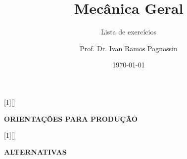 \usepackage[utf8]{inputenc}
\usepackage{lmodern}
\usepackage[T1]{fontenc}
\usepackage[brazil]{babel}

\usepackage{icomma}
\usepackage{amsmath}
\usepackage{amssymb}
\usepackage{xspace}
\usepackage[locale=FR]{siunitx}
\usepackage{booktabs}
\usepackage{hyperref}
\usepackage[margin=2.5cm]{geometry}
\usepackage{graphicx}\graphicspath{{assets/}}
\usepackage{icomma}
\usepackage{lastpage}
\usepackage{comment}

\usepackage{irpagnossin-basic}
\usepackage{irpagnossin-exam}

\usepackage{fancyhdr}
\fancyhead{}
\fancyfoot{}
\lfoot{}
\renewcommand{\headrulewidth}{0pt}
\pagestyle{fancy}


\title{Mecânica Geral}
\subtitle{Lista de exercícios}
\author{Prof. Dr. Ivan Ramos Pagnossin}
\date{\today}

\let\emph=\textbf
\newcommand\rightanswer{\textcolor{magenta}{$\leftarrow$(resposta correta)}}
\newcommand\vmeasure[2]{\ensuremath{#1}~\unit{#2}}

\newcommand\ava[1]{``\texttt{#1}''}
\newcommand\pd[2]{\ensuremath{\frac{\partial #1}{\partial #2}}}

\newcommand\half{\ensuremath{\frac{1}{2}}}

[1][]{%
	\color{blue!50!black}
  \vspace{\questionskip}
  \noindent
  \begingroup
    \bfseries\upshape\selectfont
    \color{blue!50!black}
    \MakeUppercase{orientações para produção}%
  \endgroup
  \begingroup
  	\footnotesize
  \endgroup
  \par
  \footnotesize
  \noindent\BODY
  \par
}{%
}

[1][]{%
  \vspace{\questionskip}
  \color{blue!50!black}
  \noindent
  \begingroup
    \footnotesize
    \bfseries\upshape\selectfont
    \color{blue!50!black}
    \MakeUppercase{alternativas}%
  \endgroup
  \begingroup
    \footnotesize
  \endgroup
  \par
  \footnotesize
  \noindent\BODY
  \par
}{%
}


\newcommand\centeredfigure[2]{\begin{center}{\texttt{[image: \#2]}}\end{center}}